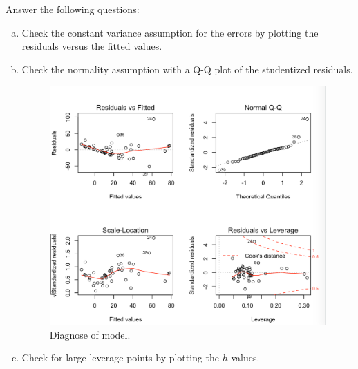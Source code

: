 \documentclass[12pt,letterpaper]{article}
\begin{document}
\vspace{.5cm}
  
\vspace{.5cm}
Answer the following questions:
\vspace{.5cm}
\begin{enumerate}[(a)]
	 \item Check the constant variance assumption for the errors by plotting the residuals versus the fitted values. 

	\item Check the normality assumption with a Q-Q plot of the studentized residuals. 
	\vspace{1cm}	
		  
		 
	\begin{figure}[h!]
		\includegraphics[width=\linewidth]{PS51}
		\caption{ Diagnose of model.}
		\label{fig:PS51}
	\end{figure}	
	\vspace{1cm}
 
    \newpage
	\item Check for large leverage points by plotting the $h$ values.
		  
		\vspace{1cm}
	

\end{enumerate}
\end{document}
